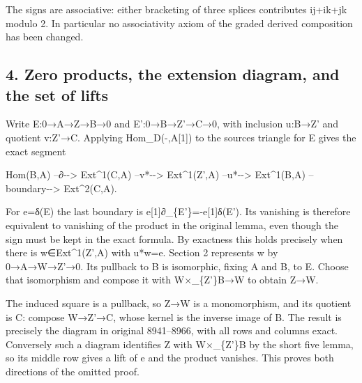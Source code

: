The signs are associative:\allowbreak{} either bracketing of three splices contributes ij\allowbreak{}+ik\allowbreak{}+jk modulo 2. In particular no associativity axiom of the graded derived composition has been changed.

\subsection{\texorpdfstring{4. Zero products,\allowbreak{} the extension diagram,\allowbreak{} and the set of lifts}{4. Zero  the extension  and the set of lifts}}\label{proofs-8774-9196-zero-products-the-extension-diagram-and-the-set-of-lifts}

Write E:\allowbreak{}0\allowbreak{}→A\allowbreak{}→Z\allowbreak{}→B\allowbreak{}→0 and E':\allowbreak{}0\allowbreak{}→B\allowbreak{}→Z'\allowbreak{}→C\allowbreak{}→0,\allowbreak{} with inclusion u:\allowbreak{}B\allowbreak{}→Z' and quotient v:\allowbreak{}Z'\allowbreak{}→C. Applying Hom\_\allowbreak{}D(-,\allowbreak{}A[1]\allowbreak{})\allowbreak{} to the source\textquotesingle s triangle for E\textquotesingle{} gives the exact segment

Hom(B,\allowbreak{}A)\allowbreak{} --∂-\allowbreak{}-> Ext\textasciicircum{}1(C,\allowbreak{}A)\allowbreak{} --v*-\allowbreak{}-> Ext\textasciicircum{}1(Z',\allowbreak{}A)\allowbreak{} --u*-\allowbreak{}-> Ext\textasciicircum{}1(B,\allowbreak{}A)\allowbreak{} --boundary-\allowbreak{}-> Ext\textasciicircum{}2(C,\allowbreak{}A)\allowbreak{}.

For e\allowbreak{}=δ(E)\allowbreak{} the last boundary is e[1]\allowbreak{}∂\_\allowbreak{}\{E'\}\allowbreak{}=-e[1]\allowbreak{}δ(E')\allowbreak{}. Its vanishing is therefore equivalent to vanishing of the product in the original lemma,\allowbreak{} even though the sign must be kept in the exact formula. By exactness this holds precisely when there is w\allowbreak{}∈Ext\textasciicircum{}1(Z',\allowbreak{}A)\allowbreak{} with u*w\allowbreak{}=e. Section 2 represents w by 0\allowbreak{}→A\allowbreak{}→W\allowbreak{}→Z'\allowbreak{}→0. Its pullback to B is isomorphic,\allowbreak{} fixing A and B,\allowbreak{} to E. Choose that isomorphism and compose it with W×\_\allowbreak{}\{Z'\}B\allowbreak{}→W to obtain Z\allowbreak{}→W.

The induced square is a pullback,\allowbreak{} so Z\allowbreak{}→W is a monomorphism,\allowbreak{} and its quotient is C:\allowbreak{} compose W\allowbreak{}→Z'\allowbreak{}→C,\allowbreak{} whose kernel is the inverse image of B. The result is precisely the diagram in original 8941–\allowbreak{}8966,\allowbreak{} with all rows and columns exact. Conversely such a diagram identifies Z with W×\_\allowbreak{}\{Z'\}B by the short five lemma,\allowbreak{} so its middle row gives a lift of e and the product vanishes. This proves both directions of the omitted proof.

